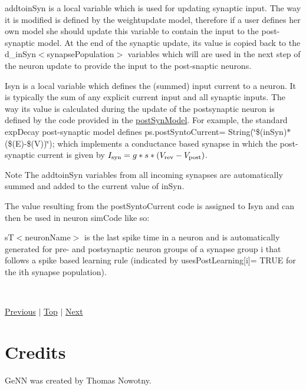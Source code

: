 \begin{DoxyItemize}
\item {\ttfamily addtoin\+Syn} is a local variable which is used for updating synaptic input. The way it is modified is defined by the weightupdate model, therefore if a user defines her own model she should update this variable to contain the input to the post-\/synaptic model. At the end of the synaptic update, its value is copied back to the d\+\_\+in\+Syn$<$synapse\+Population$>$ variables which will are used in the next step of the neuron update to provide the input to the post-\/snaptic neurons.
\item {\ttfamily Isyn} is a local variable which defines the (summed) input current to a neuron. It is typically the sum of any explicit current input and all synaptic inputs. The way its value is calculated during the update of the postsynaptic neuron is defined by the code provided in the \hyperlink{structpostSynModel}{post\+Syn\+Model}. For example, the standard {\ttfamily exp\+Decay} post-\/synaptic model defines ps.\+post\+Synto\+Current= String(\char`\"{}\$(in\+Syn)$\ast$(\$(\+E)-\/\$(\+V))\char`\"{});  which implements a conductance based synapse in which the post-\/synaptic current is given by $I_{\rm syn}= g*s*(V_{\rm rev}-V_{\rm post})$. \begin{DoxyNote}{Note}
The {\ttfamily addtoin\+Syn} variables from all incoming synapses are automatically summed and added to the current value of {\ttfamily in\+Syn}.
\end{DoxyNote}
The value resulting from the {\ttfamily post\+Synto\+Current} code is assigned to {\ttfamily Isyn} and can then be used in neuron sim\+Code like so\+: 

\item {\ttfamily s\+T$<$neuron\+Name$>$} is the last spike time in a neuron and is automatically generated for pre-\/ and postsynaptic neuron groups of a synapse group i that follows a spike based learning rule (indicated by uses\+Post\+Learning\mbox{[}i\mbox{]}= T\+R\+U\+E for the ith synapse population).
\end{DoxyItemize}

~\newline
 

 \hyperlink{sect_postsyn}{Previous} $\vert$ \hyperlink{ListOfVariables}{Top} $\vert$ \hyperlink{Credits}{Next} \hypertarget{Credits}{}\section{Credits}\label{Credits}
Ge\+N\+N was created by Thomas Nowotny.

